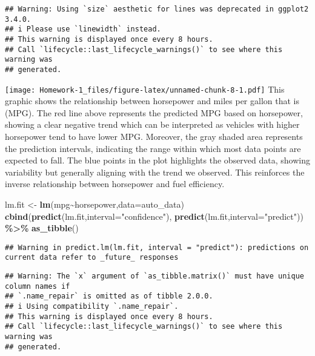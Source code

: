 \documentclass[
]{article}
\newenvironment{Shaded}{\begin{snugshade}}{\end{snugshade}}
\newcommand{\AttributeTok}[1]{\textcolor[rgb]{0.13,0.29,0.53}{#1}}
\newcommand{\FunctionTok}[1]{\textcolor[rgb]{0.13,0.29,0.53}{\textbf{#1}}}
\newcommand{\NormalTok}[1]{#1}
\newcommand{\OtherTok}[1]{\textcolor[rgb]{0.56,0.35,0.01}{#1}}
\newcommand{\SpecialCharTok}[1]{\textcolor[rgb]{0.81,0.36,0.00}{\textbf{#1}}}
\newcommand{\StringTok}[1]{\textcolor[rgb]{0.31,0.60,0.02}{#1}}
\begin{document}
\begin{verbatim}
## Warning: Using `size` aesthetic for lines was deprecated in ggplot2 3.4.0.
## i Please use `linewidth` instead.
## This warning is displayed once every 8 hours.
## Call `lifecycle::last_lifecycle_warnings()` to see where this warning was
## generated.
\end{verbatim}

\texttt{[image: Homework-1\_files/figure-latex/unnamed-chunk-8-1.pdf]}
This graphic shows the relationship between horsepower and miles per
gallon that is (MPG). The red line above represents the predicted MPG
based on horsepower, showing a clear negative trend which can be
interpreted as vehicles with higher horsepower tend to have lower MPG.
Moreover, the gray shaded area represents the prediction intervals,
indicating the range within which most data points are expected to fall.
The blue points in the plot highlights the observed data, showing
variability but generally aligning with the trend we observed. This
reinforces the inverse relationship between horsepower and fuel
efficiency.

\begin{Shaded}
\begin{Highlighting}[]
\NormalTok{lm.fit }\OtherTok{\textless{}{-}} \FunctionTok{lm}\NormalTok{(mpg}\SpecialCharTok{\textasciitilde{}}\NormalTok{horsepower,}\AttributeTok{data=}\NormalTok{auto\_data)}
\FunctionTok{cbind}\NormalTok{(}\FunctionTok{predict}\NormalTok{(lm.fit,}\AttributeTok{interval=}\StringTok{"confidence"}\NormalTok{),}
      \FunctionTok{predict}\NormalTok{(lm.fit,}\AttributeTok{interval=}\StringTok{"predict"}\NormalTok{)) }\SpecialCharTok{\%\textgreater{}\%} \FunctionTok{as\_tibble}\NormalTok{()}
\end{Highlighting}
\end{Shaded}

\begin{verbatim}
## Warning in predict.lm(lm.fit, interval = "predict"): predictions on current data refer to _future_ responses
\end{verbatim}

\begin{verbatim}
## Warning: The `x` argument of `as_tibble.matrix()` must have unique column names if
## `.name_repair` is omitted as of tibble 2.0.0.
## i Using compatibility `.name_repair`.
## This warning is displayed once every 8 hours.
## Call `lifecycle::last_lifecycle_warnings()` to see where this warning was
## generated.
\end{verbatim}
\end{document}
